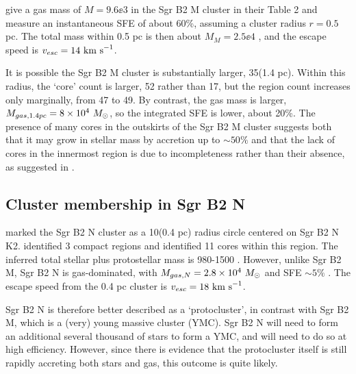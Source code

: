 \documentclass[twocolumn]{aastex61}
\begin{document}

\citet{Schmiedeke2016a} give a gas mass of $M=9.6\ee{3}$ \msun in the Sgr B2 M
cluster in their Table 2 and measure an instantaneous SFE of about 60\%, assuming
a cluster radius $r=0.5$ pc.  The total mass within 0.5 pc is then about $M_M =
2.5\ee{4}$ \msun, and the escape speed is $v_{esc}=14~\textrm{km~s}^{-1}$.



It is possible the Sgr B2 M cluster is substantially larger, 35\arcsec (1.4 pc).
Within this radius, the `core' count is larger, 52 rather than 17, but the \hii
region count increases only marginally, from 47 to 49.  By contrast,
the gas mass is larger, $M_{gas,1.4pc} = 8\times10^{4}~M_{\odot}$, so the integrated SFE is lower,
about 20\%.  
The presence of many cores in the outskirts of the Sgr B2 M cluster suggests
both that it may grow in stellar mass by accretion up to $\sim50\%$ and that
the lack of cores in the innermost region is due to incompleteness rather than
their absence, as suggested in \citet{Ginsburg2018a}.

\subsection{Cluster membership in Sgr B2 N}
\citet{Schmiedeke2016a} marked the Sgr B2 N cluster as a 10\arcsec  (0.4 pc) radius circle
centered on Sgr B2 N K2.  \citet{Schmiedeke2016a} identified 3 compact \hii regions
and \citet{Ginsburg2018a} identified 11 cores within this region.  The inferred
total stellar plus protostellar mass is 980-1500 \msun.  However, unlike Sgr B2
M, Sgr B2 N is gas-dominated, with $M_{gas,N} = 2.8\times10^{4}~M_{\odot}$ and SFE
$\sim5\%$ \citep{Schmiedeke2016a}.  The escape speed from the 0.4 pc cluster is
$v_{esc} = 18~\textrm{km~s}^{-1}$.

Sgr B2 N is therefore better described as a `protocluster', in contrast with
Sgr B2 M, which is a (very) young massive cluster (YMC).  Sgr B2 N will need to
form an additional several thousand \msun of stars to form a YMC, and will need
to do so at high efficiency.  However, since there is evidence that the
protocluster itself is still rapidly accreting both stars and gas, this outcome
is quite likely.
\end{document}
